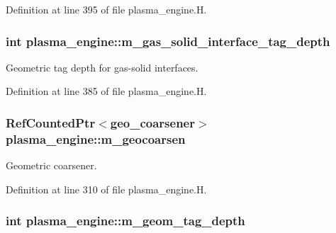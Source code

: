 Definition at line 395 of file plasma\+\_\+engine.\+H.

\subsubsection[{\texorpdfstring{m\+\_\+gas\+\_\+solid\+\_\+interface\+\_\+tag\+\_\+depth}{m_gas_solid_interface_tag_depth}}]{\setlength{\rightskip}{0pt plus 5cm}int plasma\+\_\+engine\+::m\+\_\+gas\+\_\+solid\+\_\+interface\+\_\+tag\+\_\+depth\hspace{0.3cm}{\ttfamily [protected]}}\hypertarget{classplasma__engine_a39a131afa18a9d5eb80b02ea8ebd51bc}{}\label{classplasma__engine_a39a131afa18a9d5eb80b02ea8ebd51bc}


Geometric tag depth for gas-\/solid interfaces. 



Definition at line 385 of file plasma\+\_\+engine.\+H.

\subsubsection[{\texorpdfstring{m\+\_\+geocoarsen}{m_geocoarsen}}]{\setlength{\rightskip}{0pt plus 5cm}Ref\+Counted\+Ptr$<${\bf geo\+\_\+coarsener}$>$ plasma\+\_\+engine\+::m\+\_\+geocoarsen\hspace{0.3cm}{\ttfamily [protected]}}\hypertarget{classplasma__engine_a23492fa5ea4b57fe3a9e9ee647fd4814}{}\label{classplasma__engine_a23492fa5ea4b57fe3a9e9ee647fd4814}


Geometric coarsener. 



Definition at line 310 of file plasma\+\_\+engine.\+H.

\subsubsection[{\texorpdfstring{m\+\_\+geom\+\_\+tag\+\_\+depth}{m_geom_tag_depth}}]{\setlength{\rightskip}{0pt plus 5cm}int plasma\+\_\+engine\+::m\+\_\+geom\+\_\+tag\+\_\+depth\hspace{0.3cm}{\ttfamily [protected]}}\hypertarget{classplasma__engine_af4cedda8e4d0f803d4816476c3be422c}{}\label{classplasma__engine_af4cedda8e4d0f803d4816476c3be422c}


